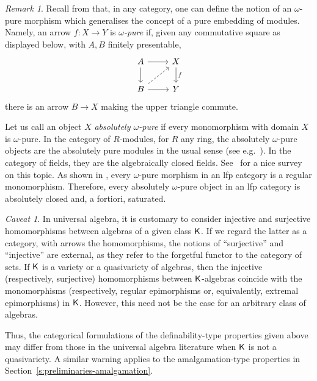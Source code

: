\documentclass[a4paper,10pt,reqno]{amsart}
\theoremstyle{definition}
\theoremstyle{remark}
\newtheorem{remark}[theorem]{Remark}
\newtheorem*{caveat}{Caveat}
\newcommand{\K}{{\sf K}}									%
\begin{document}
\begin{remark}\label{rm:purity}
Recall from \cite[Definition~2.27]{ar94book} that, in any category, one can define the notion of an $\omega$-pure morphism which generalises the concept of a pure embedding of modules. Namely, an arrow $f\colon X\to Y$ is \emph{$\omega$-pure} if, given any commutative square as displayed below, with $A,B$ finitely presentable,
\[\begin{tikzcd}
A \arrow{d} \arrow{r} & X \arrow{d}{f} \\
B \arrow{r} \arrow[dashed]{ur} & Y
\end{tikzcd}\]
there is an arrow $B\to X$ making the upper triangle commute. 

Let us call an object $X$ \emph{absolutely $\omega$-pure} if every monomorphism with domain $X$ is $\omega$-pure. In the category of $R$-modules, for $R$ any ring, the absolutely $\omega$-pure objects are the absolutely pure modules in the usual sense (see e.g.\ \cite{Maddox1967}). In the category of fields, they are the algebraically closed fields. See~\cite{Rothmaler1997} for a nice survey on this topic. As shown in \cite[Proposition~2.31]{ar94book}, every $\omega$-pure morphism in an lfp category is a regular monomorphism. Therefore, every absolutely $\omega$-pure object in an lfp category is absolutely closed and, a fortiori, saturated.
\end{remark}

\begin{caveat}
In universal algebra, it is customary to consider injective and surjective homomorphisms between algebras of a given class $\K$. If we regard the latter as a category, with arrows the homomorphisms, the notions of ``surjective'' and ``injective'' are external, as they refer to the forgetful functor to the category of sets. If $\K$ is a variety or a quasivariety of algebras, then the injective (respectively, surjective) homomorphisms between $\K$-algebras coincide with the monomorphisms (respectively, regular epimorphisms or, equivalently, extremal epimorphisms) in $\K$. However, this need not be the case for an arbitrary class of algebras. 

Thus, the categorical formulations of the definability-type properties given above may differ from those in the universal algebra literature when $\K$ is not a quasivariety. A similar warning applies to the amalgamation-type properties in Section~\ref{s:preliminaries-amalgamation}.
\end{caveat}
\end{document}
